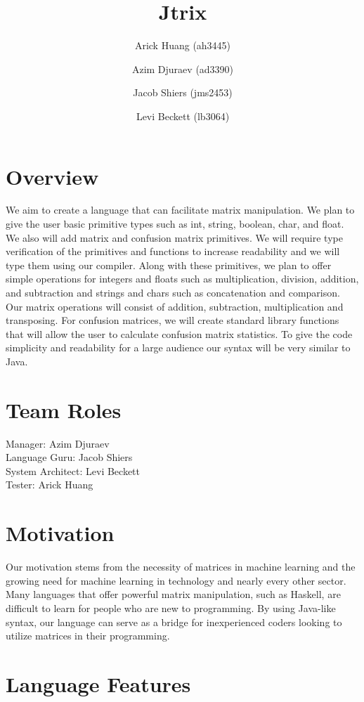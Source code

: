 \documentclass[12pt]{article}
\title{Jtrix}
\author{
\centering
Arick Huang (ah3445) \and
Azim Djuraev (ad3390) \and
Jacob Shiers (jms2453) \and
Levi Beckett (lb3064)
}
\begin{document}
\maketitle
\section{Overview}
We aim to create a language that can facilitate matrix manipulation. We plan to give the user basic primitive types such as int, string, boolean, char, and float. We also will add matrix and confusion matrix primitives. We will require type verification of the primitives and functions to increase readability and we will type them using our compiler. Along with these primitives, we plan to offer simple operations for integers and floats such as multiplication, division, addition, and subtraction and strings and chars such as concatenation and comparison. Our matrix operations will consist of addition, subtraction, multiplication and transposing. For confusion matrices, we will create standard library functions that will allow the user to calculate confusion matrix statistics. To give the code simplicity and readability for a large audience our syntax will be very similar to Java.

\section{Team Roles}
Manager: Azim Djuraev\\
Language Guru: Jacob Shiers\\
System Architect: Levi Beckett\\
Tester: Arick Huang

\section{Motivation}
Our motivation stems from the necessity of matrices in machine learning and the growing need for machine learning in technology and nearly every other sector. Many languages that offer powerful matrix manipulation, such as Haskell, are difficult to learn for people who are new to programming. By using Java-like syntax, our language can serve as a bridge for inexperienced coders looking to utilize matrices in their programming.

\section{Language Features}
\end{document}
